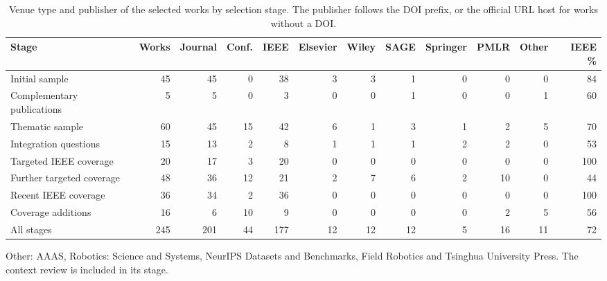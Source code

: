 \begin{table}[!t]
\centering
\caption{Venue type and publisher of the selected works by selection stage. The publisher follows the DOI prefix, or the official URL host for works without a DOI.}
\label{tab:venue-mix}
\surveytableformat
\setlength{\tabcolsep}{3.4pt}
\begin{tabularx}{\linewidth}{@{}Yrrrrrrrrrrr@{}}
\toprule
\textbf{Stage} & \textbf{Works} & \textbf{Journal} & \textbf{Conf.} & \textbf{IEEE} & \textbf{Elsevier} & \textbf{Wiley} & \textbf{SAGE} & \textbf{Springer} & \textbf{PMLR} & \textbf{Other} & \textbf{IEEE \%} \\
\midrule
Initial sample & 45 & 45 & 0 & 38 & 3 & 3 & 1 & 0 & 0 & 0 & 84 \\
Complementary publications & 5 & 5 & 0 & 3 & 0 & 0 & 1 & 0 & 0 & 1 & 60 \\
Thematic sample & 60 & 45 & 15 & 42 & 6 & 1 & 3 & 1 & 2 & 5 & 70 \\
Integration questions & 15 & 13 & 2 & 8 & 1 & 1 & 1 & 2 & 2 & 0 & 53 \\
Targeted IEEE coverage & 20 & 17 & 3 & 20 & 0 & 0 & 0 & 0 & 0 & 0 & 100 \\
Further targeted coverage & 48 & 36 & 12 & 21 & 2 & 7 & 6 & 2 & 10 & 0 & 44 \\
Recent IEEE coverage & 36 & 34 & 2 & 36 & 0 & 0 & 0 & 0 & 0 & 0 & 100 \\
Coverage additions & 16 & 6 & 10 & 9 & 0 & 0 & 0 & 0 & 2 & 5 & 56 \\
\midrule
All stages & 245 & 201 & 44 & 177 & 12 & 12 & 12 & 5 & 16 & 11 & 72 \\
\bottomrule
\end{tabularx}
\par\vspace{3pt}\parbox{\linewidth}{\footnotesize\raggedright Other: AAAS, Robotics: Science and Systems, NeurIPS Datasets and Benchmarks, Field Robotics and Tsinghua University Press. The context review is included in its stage.}
\end{table}
